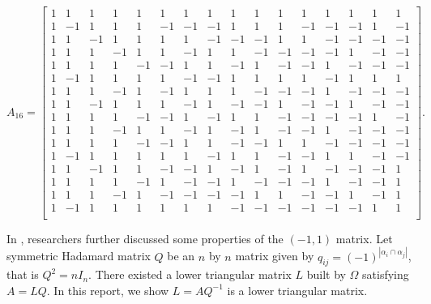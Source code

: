 \documentclass[11pt]{article}
\begin{document}
$$A_{16} = 
\left[\begin{smallmatrix}
    1 & 1 & 1 & 1 & 1 & 1 & 1 & 1 & 1 & 1 & 1 & 1 & 1 & 1 & 1 & 1 \\
    1 & -1 & 1  & 1  & 1  & -1 & -1 & -1 & 1  & 1  & 1  & -1 & -1 & -1 & 1  & -1 \\
    1 & 1  & -1 & 1  & 1  & 1  & 1  & -1 & -1 & -1 & 1  & 1  & -1 & -1 & -1 & -1 \\
    1 & 1  & 1  & -1 & 1  & 1  & -1 & 1  & 1  & -1 & -1 & -1 & -1 & 1  & -1 & -1 \\
    1 & 1  & 1  & 1  & -1 & -1 & 1  & 1  & -1 & 1  & -1 & -1 & 1  & -1 & -1 & -1 \\
    1 & -1 & 1  & 1  & 1  & 1  & -1 & -1 & 1  & 1  & 1  & 1  & -1 & 1  & 1  & 1  \\
    1 & 1  & 1  & -1 & 1  & -1 & 1  & 1  & 1  & -1 & -1 & -1 & 1  & -1 & -1 & -1 \\
    1 & 1  & -1 & 1  & 1  & 1  & -1 & 1  & -1 & -1 & 1  & -1 & -1 & 1  & -1 & -1 \\
    1 & 1  & 1  & 1  & -1 & -1 & 1  & -1 & 1  & 1  & -1 & -1 & -1 & -1 & 1  & -1 \\
    1 & 1  & 1  & -1 & 1  & 1  & -1 & 1  & -1 & 1  & -1 & -1 & 1  & -1 & -1 & -1 \\
    1 & 1  & 1  & 1  & -1 & -1 & 1  & 1  & -1 & -1 & 1  & 1  & -1 & -1 & -1 & -1 \\
    1 & -1 & 1  & 1  & 1  & 1  & 1  & -1 & 1  & 1  & -1 & -1 & 1  & 1  & -1 & -1 \\
    1 & 1  & -1 & 1  & 1  & -1 & -1 & 1  & -1 & 1  & -1 & 1  & -1 & -1 & -1 & 1  \\
    1 & 1  & 1  & 1  & -1 & 1  & -1 & -1 & 1  & -1 & -1 & -1 & 1  & -1 & -1 & 1  \\
    1 & 1  & 1  & -1 & 1  & -1 & -1 & -1 & -1 & 1  & 1  & -1 & -1 & 1  & -1 & 1  \\
    1 & -1 & 1  & 1  & 1  & 1  & 1  & 1  & -1 & -1 & -1 & -1 & -1 & -1 & 1  & 1  \\
\end{smallmatrix}\right].
$$

In \cite{ALON1997133}, researchers further discussed some properties of the $(-1, 1)$ matrix. Let symmetric Hadamard matrix $Q$ be an $n$ by $n$ matrix given by $q_{ij} = (-1)^{|\alpha_i\cap\alpha_j|}$, that is $Q^2 = nI_n$. There existed a lower triangular matrix $L$ built by $\Omega$ satisfying $A=LQ$. In this report, we show $L = AQ^{-1}$ is a lower triangular matrix.
\end{document}
